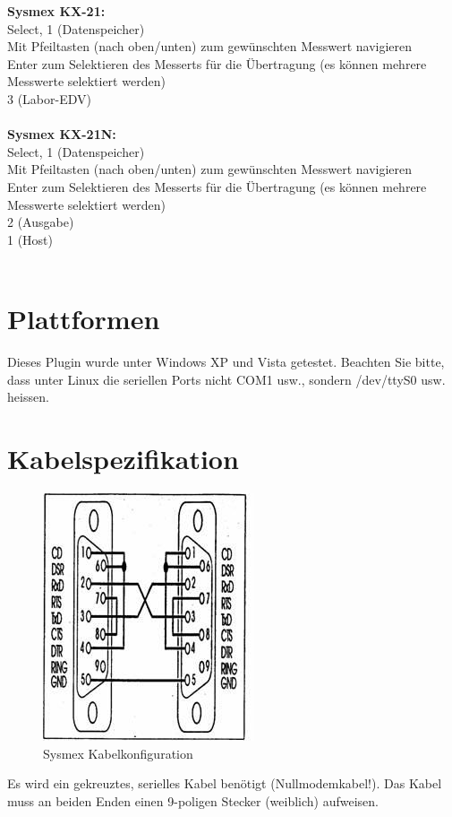\documentclass[a4paper]{scrartcl}
\begin{document}
\textbf{Sysmex KX-21:}\\
Select, 1 (Datenspeicher)\\
Mit Pfeiltasten (nach oben/unten) zum gew\"unschten Messwert navigieren\\
Enter zum Selektieren des Messerts f\"ur die \"Ubertragung (es k\"onnen mehrere Messwerte selektiert werden)\\
3 (Labor-EDV)\\
\\
\textbf{Sysmex KX-21N:}\\
Select, 1 (Datenspeicher)\\
Mit Pfeiltasten (nach oben/unten) zum gew\"unschten Messwert navigieren\\
Enter zum Selektieren des Messerts f\"ur die \"Ubertragung (es k\"onnen mehrere Messwerte selektiert werden)\\
2 (Ausgabe)\\
1 (Host)\\
\\
\section{Plattformen}
Dieses Plugin wurde unter Windows XP und Vista getestet. Beachten Sie bitte, dass unter Linux die seriellen Ports nicht COM1 usw., sondern /dev/ttyS0 usw. heissen.
\section{Kabelspezifikation}
\begin{figure}[h]
    \includegraphics{kabel}
    \caption{Sysmex Kabelkonfiguration}
    \label{fig:kabel}
\end{figure}
Es wird ein gekreuztes, serielles Kabel ben\"otigt (Nullmodemkabel!). Das Kabel muss an beiden Enden einen 9-poligen Stecker (weiblich) aufweisen.
\end{document}
